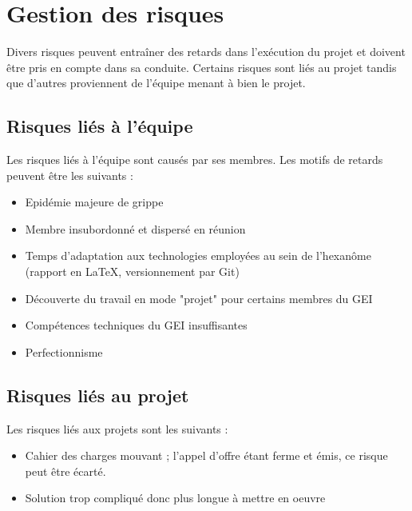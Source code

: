 \section{Gestion des risques}

Divers risques peuvent entraîner des retards dans l'exécution du projet et
doivent être pris en compte dans sa conduite. Certains risques sont liés au
projet tandis que d'autres proviennent de l'équipe menant à bien le projet.

\subsection{Risques liés à l'équipe}

Les risques liés à l'équipe sont causés par ses membres. Les motifs de
retards peuvent être les suivants :

\begin{itemize}

\item Epidémie majeure de grippe
\item Membre insubordonné et dispersé en réunion
\item Temps d'adaptation aux technologies employées au sein de l'hexanôme
(rapport en \LaTeX, versionnement par Git)
\item Découverte du travail en mode "projet" pour certains membres du GEI
\item Compétences techniques du GEI insuffisantes
\item Perfectionnisme

\end{itemize}


\subsection{Risques liés au projet}

Les risques liés aux projets sont les suivants :

\begin{itemize}

\item Cahier des charges mouvant ; l'appel d'offre étant ferme et émis, ce
risque peut être écarté.
\item Solution trop compliqué donc plus longue à mettre en oeuvre

\end{itemize}

\pagebreak

